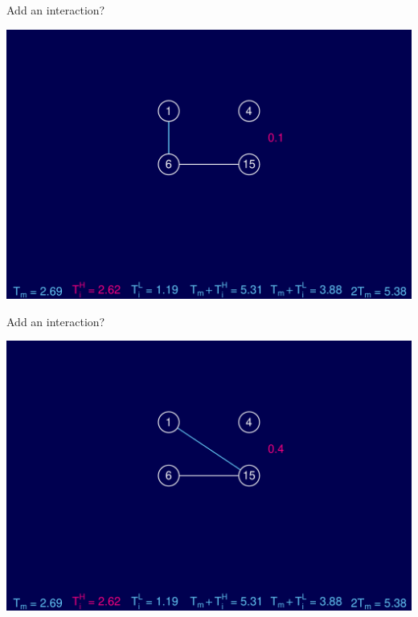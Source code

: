 \documentclass[12pt]{article}
\newcommand{\headsize}{\fontsize{35}{35} \selectfont}
\begin{document}
\newpage

\addtocounter{page}{-1}

\headsize \color{myyellow}
\hfill \begin{minipage}{5.75in}
\centering
Add an interaction?
\end{minipage}

\vfill


\centerline{\includegraphics{FigsB/hyper_models5.pdf}}



\newpage

\addtocounter{page}{-1}

\headsize \color{myyellow}
\hfill \begin{minipage}{5.75in}
\centering
Add an interaction?
\end{minipage}

\vfill


\centerline{\includegraphics{FigsB/hyper_models6.pdf}}
\end{document}
